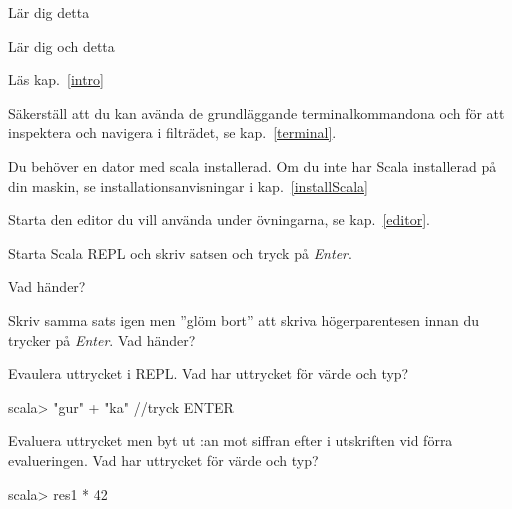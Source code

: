 

\begin{Goals}
\item Lär dig detta
\item Lär dig och detta
\end{Goals}

\begin{Preparations}
\item Läs kap.~\ref{intro}
\item Säkerställ att du kan avända de grundläggande terminalkommandona  och  för att inspektera och navigera i filträdet, se kap.~\ref{terminal}. 
\item Du behöver en dator med scala installerad. Om du inte har Scala installerad på din maskin, se installationsanvisningar i kap.~\ref{installScala}
\item Starta den editor du vill använda under övningarna, se kap.~\ref{editor}.
\end{Preparations}

\BasicTasks


\TaskPen Starta Scala REPL och skriv satsen  och tryck på \textit{Enter}. 


\Subtask Vad händer? 

\Subtask Skriv samma sats igen men ''glöm bort'' att skriva högerparentesen innan du trycker på \textit{Enter}. Vad händer?

\Subtask Evaulera uttrycket  i REPL. Vad har uttrycket för värde och typ? 
\begin{REPL}
scala> "gur" + "ka"   //tryck ENTER
\end{REPL}

\Subtask Evaluera uttrycket  men byt ut :an mot siffran efter  i utskriften vid förra evalueringen. Vad har uttrycket för värde och typ?
\begin{REPL}
scala> res1 * 42
\end{REPL}

